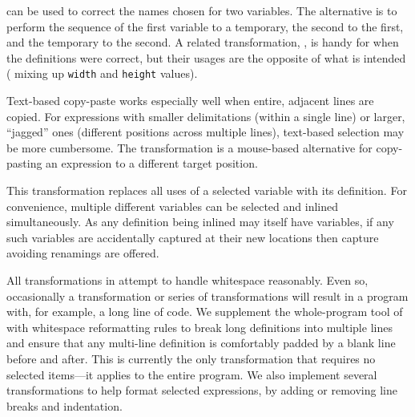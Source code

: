 
 can be used to correct the names
chosen for two variables. The alternative is to perform the sequence
of  the first variable to a temporary,  the second to
the first, and  the temporary to the second.
A related transformation, , is handy for when the
definitions were correct,
but their usages are the opposite of what is intended (\eg{} mixing up
\verb+width+ and \verb+height+ values).



Text-based copy-paste works especially well when entire, adjacent
lines are copied. For expressions with smaller delimitations (within a
single line) or larger, ``jagged'' ones (different positions across multiple
lines), text-based selection may be more cumbersome.
The  transformation is a mouse-based alternative
for copy-pasting an expression to a different target position.


This transformation replaces all uses of a selected variable with its
definition. For convenience, multiple different variables can be selected and
inlined simultaneously. As any definition being inlined may itself have
variables, if any such variables are accidentally captured at their new
locations then capture avoiding renamings are offered.



All transformations in \deuce{} attempt to handle whitespace reasonably. Even so,
occasionally a transformation or series of transformations
will result in a program with, for example, a long line of code.
We supplement the whole-program  tool of \cite{sns-uist}
with whitespace reformatting rules to break long definitions into
multiple lines and ensure that any multi-line definition is comfortably padded
by a blank line before and after. This is currently the only transformation that
requires no selected items---it applies to the entire program.
We also implement several transformations to help format selected
expressions, by adding or removing line breaks and indentation.


